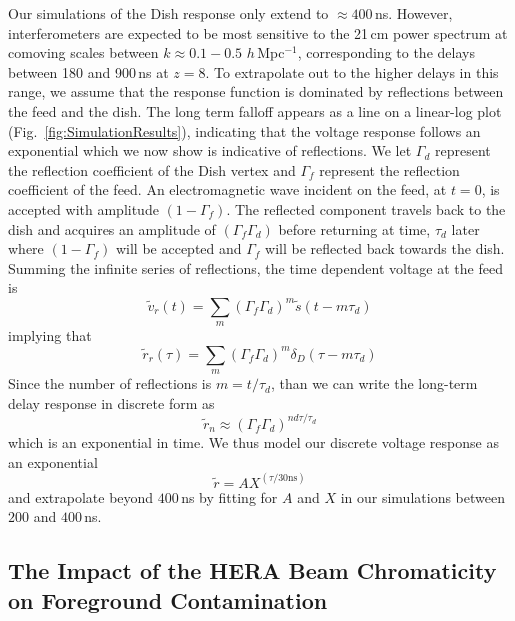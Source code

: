 \documentclass[twocolumn]{emulateapj}
\begin{document}
Our simulations of the Dish response only extend to $\approx 400$\,ns. However, interferometers are expected to be most sensitive to the 21\,cm power spectrum at comoving scales between $k\approx 0.1-0.5$ $h$\,Mpc$^{-1}$, corresponding to the delays between 180 and 900\,ns at $z=8$. To extrapolate out to the higher delays in this range, we assume that the response function is dominated by reflections between the feed and the dish. The long term falloff appears as a line on a linear-log plot (Fig.~\ref{fig:SimulationResults}), indicating that the voltage response follows an exponential which we now show is indicative of reflections. We let $\Gamma_d$ represent the reflection coefficient of the Dish vertex and $\Gamma_f$ represent the reflection coefficient of the feed. An electromagnetic wave incident on the feed, at $t=0$, is accepted with amplitude $(1-\Gamma_f)$. The reflected component travels back to the dish and acquires an amplitude of $(\Gamma_f \Gamma_d)$ before returning at time, $\tau_d$ later where $(1-\Gamma_f)$ will be accepted and $\Gamma_f$ will be reflected back towards the dish. Summing the infinite series of reflections, the time dependent voltage at the feed is
\begin{equation}
\widetilde{v}_r(t) = \sum_m \left( \Gamma_f \Gamma_d \right)^m \widetilde{s}(t-m \tau_d)
\end{equation}
implying that
\begin{equation}
\widetilde{r}_r(\tau) = \sum_m \left( \Gamma_f \Gamma_d \right)^m \delta_D(\tau-m\tau_d)
\end{equation}
Since the number of reflections is $m=t/\tau_d$, than we can write the long-term delay response in discrete form as 
\begin{equation}
\widetilde{r}_n \approx (\Gamma_f \Gamma_d)^{n d\tau/\tau_d}
\end{equation}
which is an exponential in time. We thus model our discrete voltage response as an exponential
\begin{equation}
\widetilde{r} = A X^{(\tau/30\text{ns})} 
\end{equation}
and extrapolate beyond $400$\,ns by fitting for $A$ and $X$ in our simulations between $200$ and $400$\,ns.



\subsection{The Impact of the HERA Beam Chromaticity on Foreground Contamination}\label{ssec:Leakage}
\end{document}
